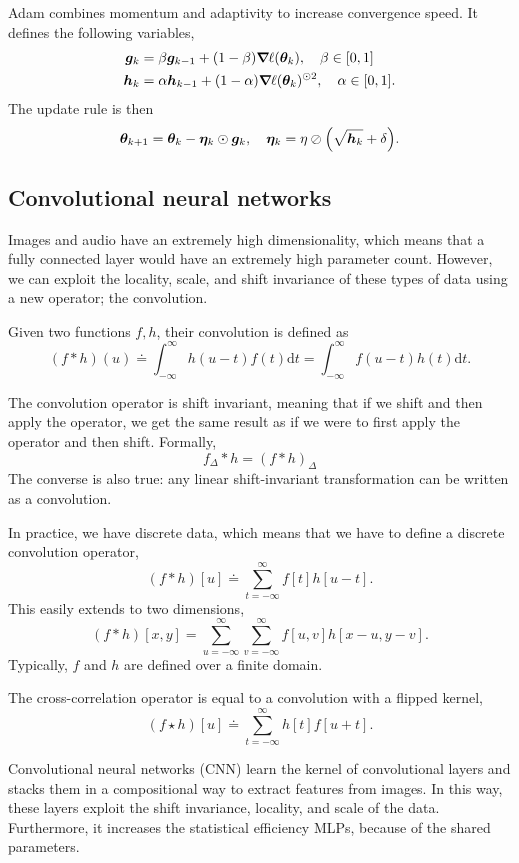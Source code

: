 Adam combines momentum and adaptivity to increase convergence speed. It defines the following
variables,
\begin{align*}
    \bm{g}_k & = \beta \bm{g}_{k-1} + (1- \beta) \bm{\nabla}_{\! } \ell(\bm{\theta}_k), \quad \beta \in [0,1]              \\
    \bm{h}_k & = \alpha \bm{h}_{k-1} + (1-\alpha) \bm{\nabla}_{\! } \ell(\bm{\theta}_k)^{\odot 2}, \quad \alpha \in [0,1].
\end{align*}
The update rule is then \[
    \vec{\theta}_{k+1} = \vec{\theta}_k - \vec{\eta}_k \odot \vec{g}_k, \quad \vec{\eta}_k = \eta \oslash \lft( \sqrt{\vec{h}_k} + \delta \rgt).
\]

\subsection{Convolutional neural networks}

Images and audio have an extremely high dimensionality, which means that a fully connected layer
would have an extremely high parameter count. However, we can exploit the locality, scale, and
shift invariance of these types of data using a new operator; the convolution.

\begin{definition}[Convolution]
    Given two functions $f,h$, their convolution is defined as \[
        (f*h)(u) \doteq \int_{-\infty}^{\infty} h(u-t)f(t) \mathrm{d}t = \int_{-\infty}^{\infty} f(u-t)h(t) \mathrm{d}t.
    \]
\end{definition}

The convolution operator is shift invariant, meaning that if we shift and then apply the operator,
we get the same result as if we were to first apply the operator and then shift. Formally, \[
    f_{\Delta} * h = (f * h)_{\Delta}
\]
The converse is also true: any linear shift-invariant transformation can be written as a
convolution.

In practice, we have discrete data, which means that we have to define a discrete convolution
operator, \[
    (f*h)[u] \doteq \sum_{t=-\infty}^{\infty} f[t] h[u-t].
\]
This easily extends to two dimensions, \[
    (f*h)[x,y] = \sum_{u=-\infty}^{\infty} \sum_{v=-\infty}^{\infty} f[u,v] h[x-u, y-v].
\]
Typically, $f$ and $h$ are defined over a finite domain.

The cross-correlation operator is equal to a convolution with a flipped kernel, \[
    (f\star h)[u] \doteq \sum_{t=-\infty}^{\infty} h[t] f[u+t].
\]

Convolutional neural networks (CNN) learn the kernel of convolutional layers and stacks them in a
compositional way to extract features from images. In this way, these layers exploit the shift
invariance, locality, and scale of the data. Furthermore, it increases the statistical efficiency
\wrt MLPs, because of the shared parameters.

